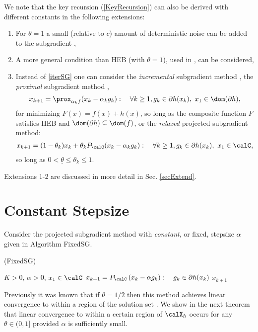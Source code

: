 \documentclass[smallextended]{svjour3}
\begin{document}
 We note that the key recursion (\ref{KeyRecursion}) can also be derived with different constants in the following extensions: 
 \begin{enumerate}
 	\item For $\theta=1$ a small (relative to $c$) amount of deterministic noise can be added to the subgradient  \cite{nedic2010effect}, 
 	\item 
 	A more general condition than HEB (with $\theta=1$), used in \cite{goffin1977convergence}, can be considered,
 	 	\item Instead of \eqref{iterSG} one can consider
 	the \emph{incremental} subgradient method \cite{nedic2001convergence}, 
 the \emph{proximal} subgradient method \cite{cruz2017proximal},
\begin{align*}
  x_{k+1}= \prox_{\alpha_k f}(x_k-\alpha_k g_k):\quad\forall k\geq 1, g_k\in\partial h(x_k),\,\, x_1\in \dom(\partial h),
\end{align*}
 for minimizing $F(x) = f(x)+h(x)$, so long as the composite function $F$ satisfies HEB and $\dom(\partial h)\subseteq\dom(f)$,
 or the \emph{relaxed} projected subgradient method:
  \begin{align*}
 x_{k+1}=(1-\theta_k)x_k + \theta_kP_\calC(x_k-\alpha_k g_k):\quad\forall k\geq 1, g_k\in\partial h(x_k),\,\, x_1\in \calC,
 \end{align*} 
 so long as $0<\underline{\theta}\leq\theta_k\leq 1$. 
  \end{enumerate}
 \label{secMy}
 
 Extensions 1-2 are discussed in more detail in Sec. \ref{secExtend}.
 
 \section{Constant Stepsize}\label{sec_const}
 Consider the projected subgradient method with \emph{constant}, or fixed, stepsize $\alpha$ given in Algorithm FixedSG.
  \begin{algorithm}
  \caption{(FixedSG)}\label{fix}
  \begin{algorithmic}[1]
  \REQUIRE $K>0$, $\alpha>0$, $x_1\in\calC$
           \STATE $x_{k+1}= P_{\calC}\left(x_k-\alpha g_k\right):\quad g_k\in\partial h(x_k)$
       \ENDFOR 
       \RETURN $x_{k+1}$
  \end{algorithmic}
  \end{algorithm}
 Previously it was known that if $\theta=1/2$ then this method achieves linear convergence to within a region of the solution set \cite{nedic2001convergence,karimi2016linear}. We show in the next theorem that linear convergence to within a certain region of $\calX_h$ occurs for any $\theta\in(0,1]$ provided $\alpha$ is sufficiently small.
 
\end{document}
